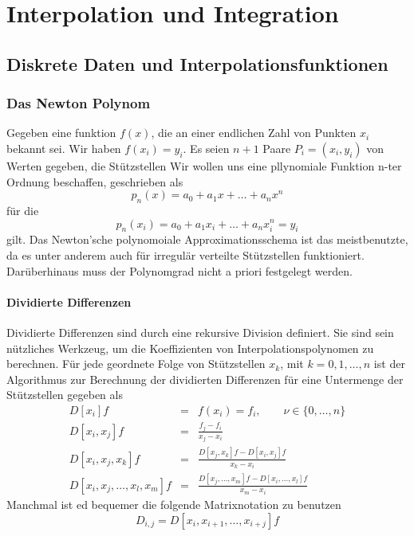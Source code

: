 \chapter{Interpolation und Integration}
\section{Diskrete Daten und Interpolationsfunktionen}
\subsection{Das Newton Polynom}\label{subsec:newton}
Gegeben eine funktion $f(x)$, die an einer endlichen Zahl von Punkten $x_i$ bekannt sei.
Wir haben $f(x_i)=y_i$.  Es seien $n+1$ Paare $P_i=(x_i,y_i)$ von Werten gegeben, die Stützstellen
Wir wollen uns eine pllynomiale Funktion n-ter Ordnung beschaffen, geschrieben als
\[p_n(x)=a_0+a_1 x+\dots +a_n x^n\]
für die
\[p_n(x_i)=a_0+a_1 x_i+\dots +a_n x_i^n=y_i\]
gilt. Das Newton'sche polynomoiale Approximationsschema ist das meistbenutzte,
da es unter anderem auch für irregulär verteilte Stützstellen funktioniert.
Darüberhinaus muss der Polynomgrad nicht a priori festgelegt werden.
\subsubsection{Dividierte Differenzen}
Dividierte Differenzen sind durch eine rekursive Division definiert. Sie sind sein nützliches Werkzeug, um die Koeffizienten von Interpolationspolynomen zu berechnen.
Für jede geordnete Folge von Stützstellen 
$x_k$, mit $k=0,1,\dots,n$ ist der Algorithmus zur Berechnung der dividierten Differenzen für eine Untermenge der Stützstellen gegeben als
\begin{eqnarray}
	\label{eq:divdiffs}
   D[x_i] f&=& f(x_i)=f_i, \qquad \nu \in \{ 0,\ldots,n\}\\
   D[x_i,x_j] f&=& \frac{f_j-f_i}{x_j-x_i}\nonumber\\
   D[x_i,x_j,x_k] f&=& \frac{D[x_j,x_k]f-D[x_i,x_j]f}{x_k-x_i}\nonumber\\
   D[x_i,x_j,\ldots,x_l,x_m] f&=& \frac{D[x_j,\dots,x_m]f-D[x_i,\dots,x_l]f}{x_m-x_i}\nonumber
\end{eqnarray} 
Manchmal ist ed bequemer die folgende Matrixnotation zu benutzen
\begin{equation} 
	D_{i,j}=D[x_i,x_{i+1},\dots,x_{i+j}]f
	\label{eq:invdivdiffs}
\end{equation}
